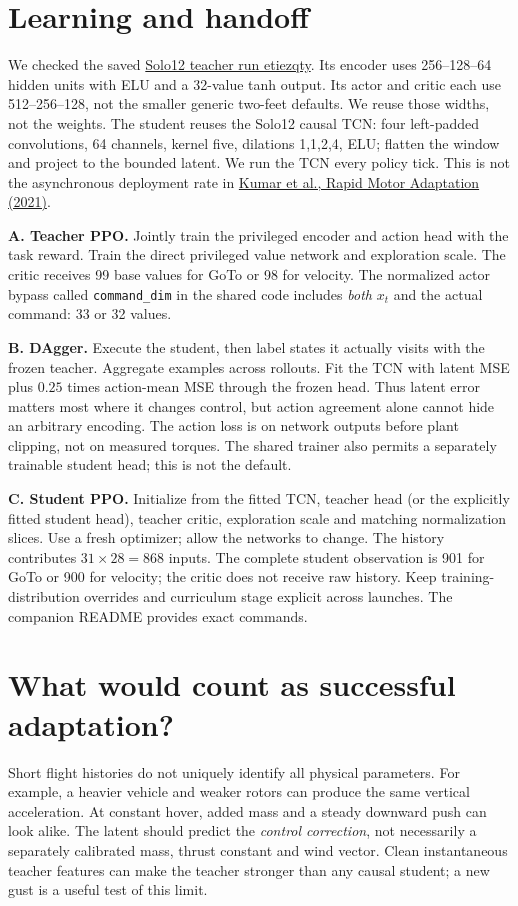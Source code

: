 \documentclass[10pt,a4paper,twocolumn]{article}
\begin{document}
\section*{Learning and handoff}
We checked the saved \href{https://wandb.ai/jordibelp/borinotIsaacLab/runs/etiezqty}{Solo12 teacher run etiezqty}. Its encoder uses 256--128--64 hidden units with ELU and a 32-value tanh output. Its actor and critic each use 512--256--128, not the smaller generic two-feet defaults. We reuse those widths, not the weights. The student reuses the Solo12 causal TCN: four left-padded convolutions, 64 channels, kernel five, dilations 1,1,2,4, ELU; flatten the window and project to the bounded latent. We run the TCN every policy tick. This is not the asynchronous deployment rate in \href{https://arxiv.org/html/2107.04034v1}{Kumar et al., Rapid Motor Adaptation (2021)}.

\textbf{A. Teacher PPO.} Jointly train the privileged encoder and action head with the task reward. Train the direct privileged value network and exploration scale. The critic receives 99 base values for GoTo or 98 for velocity. The normalized actor bypass called \texttt{command\_dim} in the shared code includes \emph{both} $x_t$ and the actual command: 33 or 32 values.

\textbf{B. DAgger.} Execute the student, then label states it actually visits with the frozen teacher. Aggregate examples across rollouts. Fit the TCN with latent MSE plus $0.25$ times action-mean MSE through the frozen head. Thus latent error matters most where it changes control, but action agreement alone cannot hide an arbitrary encoding. The action loss is on network outputs before plant clipping, not on measured torques. The shared trainer also permits a separately trainable student head; this is not the default.

\textbf{C. Student PPO.} Initialize from the fitted TCN, teacher head (or the explicitly fitted student head), teacher critic, exploration scale and matching normalization slices. Use a fresh optimizer; allow the networks to change. The history contributes $31\times28=868$ inputs. The complete student observation is 901 for GoTo or 900 for velocity; the critic does not receive raw history. Keep training-distribution overrides and curriculum stage explicit across launches. The companion README provides exact commands.

\section*{What would count as successful adaptation?}
Short flight histories do not uniquely identify all physical parameters. For example, a heavier vehicle and weaker rotors can produce the same vertical acceleration. At constant hover, added mass and a steady downward push can look alike. The latent should predict the \emph{control correction}, not necessarily a separately calibrated mass, thrust constant and wind vector. Clean instantaneous teacher features can make the teacher stronger than any causal student; a new gust is a useful test of this limit.
\end{document}
